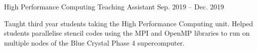 \begin{cventries}
  \vspace{-0.2em}
  
  \cventry
    {High Performance Computing Teaching Assistant} %
    {} %
    {} %
    {Sep. 2019 -- Dec. 2019} %
    {
      \begin{cvitems} %
        \item {Taught third year students taking the High Performance Computing unit. Helped students parallelise stencil codes using the MPI and OpenMP libraries to run on multiple nodes of the Blue Crystal Phase 4 supercomputer.}
      \end{cvitems}
    }


\end{cventries}
